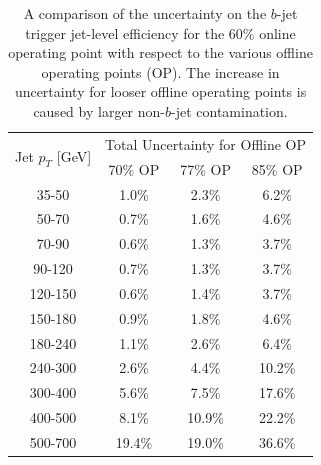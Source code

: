 \begin{table}[ht]
  \begin{center}
  \begin{tabular}{|c||c|c|c|}
    \hline
    \multirow{2}{*}{Jet $p_T$ [GeV]} &\multicolumn{3}{c|}{Total Uncertainty for Offline OP} \\ \cline{2-4} 

                & \hspace{1.5mm}70\% OP\hspace{1.5mm} & \hspace{1.5mm}77\% OP\hspace{1.5mm} & \hspace{1.5mm}85\% OP\hspace{1.5mm} \\
    \hline
    35-50   & 1.0\%   & 2.3\%   & 6.2\%  \\
    50-70   & 0.7\%   & 1.6\%   & 4.6\%  \\
    70-90   & 0.6\%   & 1.3\%   & 3.7\%  \\
    90-120  & 0.7\%   & 1.3\%   & 3.7\%  \\
    120-150 & 0.6\%   & 1.4\%   & 3.7\%  \\
    150-180 & 0.9\%   & 1.8\%   & 4.6\%  \\
    180-240 & 1.1\%   & 2.6\%   & 6.4\%  \\
    \hline          
    240-300 & 2.6\%   & 4.4\%   & 10.2\% \\
    300-400 & 5.6\%   & 7.5\%   & 17.6\% \\
    400-500 & 8.1\%   & 10.9\%  & 22.2\% \\
    500-700 & 19.4\%  & 19.0\%  & 36.6\% \\
    \hline
  \end{tabular}
  \vspace{10pt}
  \end{center}
    \vspace{-1.5em}
    \caption[A comparison of the uncertainty on the $b$-jet trigger jet-level efficiency
      for various offline operating points.]
            {
    A comparison of the uncertainty on the $b$-jet trigger jet-level efficiency
    for the 60\% online operating point with respect to the various offline operating points (OP).
    The increase in uncertainty for looser offline operating points is caused by larger non-$b$-jet contamination.
            }
  \label{tab:trig-bTrig_jetSys_opComp}
  \end{table}

\clearpage

